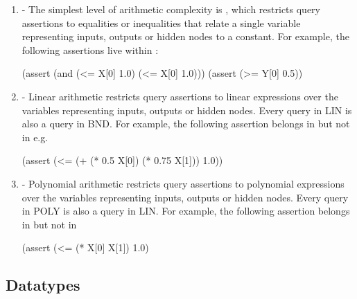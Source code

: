 \begin{enumerate}
\item \textbf{\bnd{}} - 
The simplest level of arithmetic complexity is \bnd{}, which restricts query assertions to equalities or inequalities that relate a single variable representing 
inputs, outputs or hidden nodes to a constant. For example, the following assertions live within \bnd{}:

\begin{code}[style=lbnf]
(assert (and (<= X[0] 1.0) (<= X[0] 1.0)))
(assert (>= Y[0] 0.5))
\end{code}

\item \textbf{\lin{}} - Linear arithmetic restricts query assertions to linear expressions over the variables representing inputs, outputs or hidden nodes. Every query in LIN is also a query in BND. For example, the following assertion belongs in \lin{} but not in \bnd{} e.g. 

\begin{code}[style=lbnf]
(assert (<= (+ (* 0.5 X[0]) (* 0.75 X[1])) 1.0))
\end{code}

\item \textbf{\poly{}} - Polynomial arithmetic restricts query assertions to polynomial expressions over the variables representing inputs, outputs or hidden nodes. 
Every query in POLY is also a query in LIN.
For example, the following assertion belongs in \poly{} but not in \lin{}

\begin{code}[style=lbnf]
(assert (<= (* X[0] X[1]) 1.0)
\end{code}

\end{enumerate}



\subsection{Datatypes}



